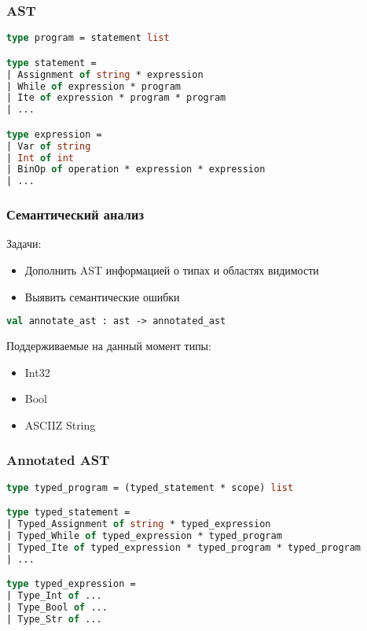 \documentclass{beamer}
\begin{document}
	\begin{frame}[fragile]
		\frametitle{AST}
		\begin{lstlisting}[language=ML] 
type program = statement list

type statement =
| Assignment of string * expression
| While of expression * program
| Ite of expression * program * program
| ...

type expression =
| Var of string
| Int of int
| BinOp of operation * expression * expression
| ...
		\end{lstlisting}
	\end{frame}
	
		\begin{frame}[fragile]
		\frametitle{Семантический анализ}
		Задачи:
		\begin{itemize}
			\item Дополнить AST информацией о типах и областях видимости
			\item Выявить семантические ошибки
		\end{itemize}
				
		\begin{lstlisting}[language=ML] 
		val annotate_ast : ast -> annotated_ast
		\end{lstlisting}
		
		Поддерживаемые на данный момент типы:
		\begin{itemize}
			\item Int32
			\item Bool
			\item ASCIIZ String
		\end{itemize}

		\end{frame}
	\begin{frame}[fragile]
			\frametitle{Annotated AST}

\begin{lstlisting}[language=ML] 
type typed_program = (typed_statement * scope) list

type typed_statement =
| Typed_Assignment of string * typed_expression
| Typed_While of typed_expression * typed_program
| Typed_Ite of typed_expression * typed_program * typed_program
| ...

type typed_expression =
| Type_Int of ...
| Type_Bool of ...
| Type_Str of ...

\end{lstlisting}

		\end{frame}
\end{document}
